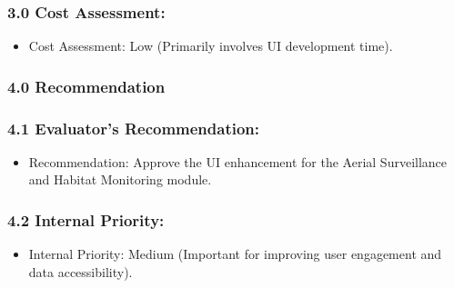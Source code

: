 \documentclass{article}
\begin{document}
\subsubsection*{3.0 Cost Assessment:}
\begin{itemize}
  \item Cost Assessment: Low (Primarily involves UI development time).
\end{itemize}

\subsubsection*{4.0 Recommendation}

\subsubsection*{4.1 Evaluator’s Recommendation:}
\begin{itemize}
  \item Recommendation: Approve the UI enhancement for the Aerial Surveillance and Habitat Monitoring module.
\end{itemize}

\subsubsection*{4.2 Internal Priority:}
\begin{itemize}
  \item Internal Priority: Medium (Important for improving user engagement and data accessibility).
\end{itemize}
\end{document}
